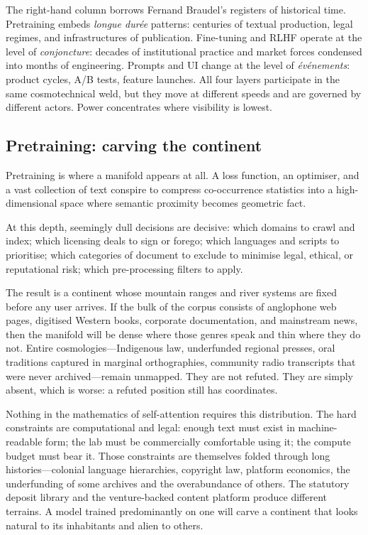 \documentclass[12pt,a4paper]{article}
\begin{document}
The right-hand column borrows Fernand Braudel's registers of historical time. Pretraining embeds \emph{longue dur\'ee} patterns: centuries of textual production, legal regimes, and infrastructures of publication. Fine-tuning and RLHF operate at the level of \emph{conjoncture}: decades of institutional practice and market forces condensed into months of engineering. Prompts and UI change at the level of \emph{\'ev\'enements}: product cycles, A/B tests, feature launches. All four layers participate in the same cosmotechnical weld, but they move at different speeds and are governed by different actors. Power concentrates where visibility is lowest.

\subsection{Pretraining: carving the continent}

Pretraining is where a manifold appears at all. A loss function, an optimiser, and a vast collection of text conspire to compress co-occurrence statistics into a high-dimensional space where semantic proximity becomes geometric fact.

At this depth, seemingly dull decisions are decisive: which domains to crawl and index; which licensing deals to sign or forego; which languages and scripts to prioritise; which categories of document to exclude to minimise legal, ethical, or reputational risk; which pre-processing filters to apply.

The result is a continent whose mountain ranges and river systems are fixed before any user arrives. If the bulk of the corpus consists of anglophone web pages, digitised Western books, corporate documentation, and mainstream news, then the manifold will be dense where those genres speak and thin where they do not. Entire cosmologies---Indigenous law, underfunded regional presses, oral traditions captured in marginal orthographies, community radio transcripts that were never archived---remain unmapped. They are not refuted. They are simply absent, which is worse: a refuted position still has coordinates.

Nothing in the mathematics of self-attention requires this distribution. The hard constraints are computational and legal: enough text must exist in machine-readable form; the lab must be commercially comfortable using it; the compute budget must bear it. Those constraints are themselves folded through long histories---colonial language hierarchies, copyright law, platform economics, the underfunding of some archives and the overabundance of others. The statutory deposit library and the venture-backed content platform produce different terrains. A model trained predominantly on one will carve a continent that looks natural to its inhabitants and alien to others.
\end{document}
